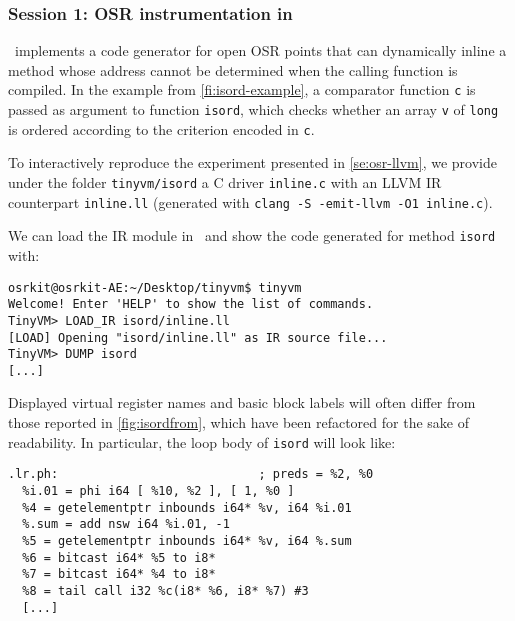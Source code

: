 
\subsubsection{Session 1: OSR instrumentation in \osrkit}

\tinyvm\ implements a code generator for open OSR points that can dynamically inline a method whose address cannot be determined when the calling function is compiled. In the example from \myfigure\ref{fi:isord-example}, a comparator function {\tt c} is passed as argument to function {\tt isord}, which checks whether an array {\tt v} of {\tt long} is ordered according to the criterion encoded in {\tt c}.

To interactively reproduce the experiment presented in \mysection\ref{se:osr-llvm}, we provide under the folder {\small\tt tinyvm/isord} a C driver {\small\tt inline.c} with an LLVM IR counterpart {\small\tt inline.ll} (generated with {\small\tt clang -S -emit-llvm -O1 inline.c}).

We can load the IR module in \tinyvm\ and show the code generated for method {\tt isord} with:
\begin{small}
\begin{verbatim}
osrkit@osrkit-AE:~/Desktop/tinyvm$ tinyvm
Welcome! Enter 'HELP' to show the list of commands.
TinyVM> LOAD_IR isord/inline.ll
[LOAD] Opening "isord/inline.ll" as IR source file...
TinyVM> DUMP isord
[...]
\end{verbatim}
\end{small}

\noindent Displayed virtual register names and basic block labels will often differ from those reported in \myfigure\ref{fig:isordfrom}, which have been refactored for the sake of readability. In particular, the loop body of {\tt isord} will look like:

\begin{small}
\begin{verbatim}
.lr.ph:                            ; preds = %2, %0
  %i.01 = phi i64 [ %10, %2 ], [ 1, %0 ]
  %4 = getelementptr inbounds i64* %v, i64 %i.01
  %.sum = add nsw i64 %i.01, -1
  %5 = getelementptr inbounds i64* %v, i64 %.sum
  %6 = bitcast i64* %5 to i8*
  %7 = bitcast i64* %4 to i8*
  %8 = tail call i32 %c(i8* %6, i8* %7) #3
  [...]
\end{verbatim}
\end{small}

\noindent

